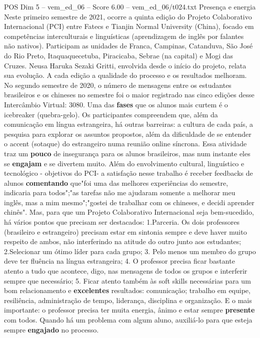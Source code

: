 \begin{textsample}{POS Dim 5 – vem\_ed\_06 – Score 6.00 – vem\_ed\_06/t024.txt}  \label{ex:f5_pos_082}
Presença e energia Neste primeiro semestre de 2021, ocorre a quinta edição do Projeto Colaborativo Internacional (PCI) entre Fatecs e Tianjin Normal University (China), focado em competências interculturais e linguísticas (aprendizagem de inglês por falantes não nativos).
Participam as unidades de Franca, Campinas, Catanduva, São José do Rio Preto, Itaquaquecetuba, Piracicaba, Sebrae (na capital) e Mogi das Cruzes.
Neusa Haruka Sezaki Gritti, envolvida desde o início do projeto, relata sua evolução.
A cada edição a qualidade do processo e os resultados melhoram.
No segundo semestre de 2020, o número de mensagens entre os estudantes brasileiros e os chineses no semestre foi o maior registrado nas cinco edições desse Intercâmbio Virtual: 3080.
Uma das \textbf{fases} que os alunos mais curtem é o icebreaker (quebra-gelo).
Os participantes compreendem que, além da comunicação em língua estrangeira, há outras barreiras: a cultura de cada país, a pesquisa para explorar os assuntos propostos, além da dificuldade de se entender o accent (sotaque) do estrangeiro numa reunião online síncrona.
Essa atividade traz um \textbf{pouco} de insegurança para os alunos brasileiros, mas num instante eles se \textbf{engajam} e se divertem muito.
Além do envolvimento cultural, linguístico e tecnológico - objetivos do PCI- a satisfação nesse trabalho é receber feedbacks de alunos \textbf{comentando} que"foi uma das melhores experiências do semestre, indicaria para todos";"as tarefas não me ajudaram somente a melhorar meu inglês, mas a mim mesmo";"gostei de trabalhar com os chineses, e decidi aprender chinês".
Mas, para que um Projeto Colaborativo Internacional seja bem-sucedido, há vários pontos que precisam ser destacados: 1.Parceria.
Os dois professores (brasileiro e estrangeiro) precisam estar em sintonia sempre e deve haver muito respeito de ambos, não interferindo na atitude do outro junto aos estudantes; 2.Selecionar um ótimo líder para cada grupo; 3.
Pelo menos um membro do grupo deve ter fluência na língua estrangeira; 4.
O professor precisa ficar bastante atento a tudo que acontece, digo, nas mensagens de todos os grupos e interferir sempre que necessário; 5.
Ficar atento também às soft skills necessárias para um bom relacionamento e \textbf{excelentes} resultados: comunicação; trabalho em equipe, resiliência, administração de tempo, liderança, disciplina e organização.
E o mais importante: o professor precisa ter muita energia, ânimo e estar sempre \textbf{presente} com todos.
Quando há um problema com algum aluno, auxiliá-lo para que esteja sempre \textbf{engajado} no processo.

\end{textsample}
